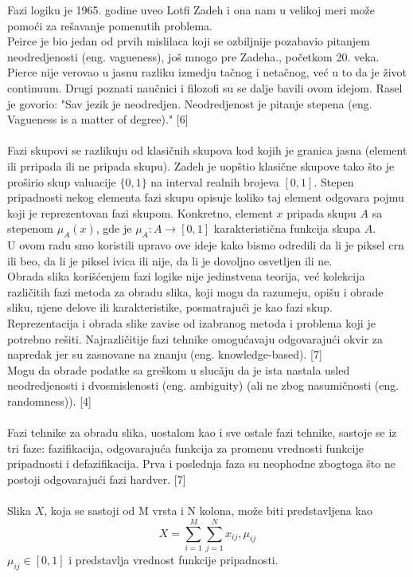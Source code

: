 \documentclass[12pt,a4paper]{article}
\theoremstyle{definition}
\theoremstyle{remark}
\theoremstyle{plain}
\begin{document}
Fazi logiku je 1965. godine uveo Lotfi Zadeh i ona nam u velikoj meri mo\v ze pomo\' ci za re\v savanje pomenutih problema. \\
Peirce je bio jedan od prvih mislilaca koji se ozbiljnije pozabavio pitanjem neodredjenosti (eng. vagueness), jo\v s mnogo pre Zadeha., po\v cetkom 20. veka. 
Pierce nije verovao u jasnu razliku izmedju ta\v cnog i neta\v cnog, ve\' c u to da je \v zivot continuum.
Drugi poznati nau\v cnici i filozofi su se dalje bavili ovom idejom. Rasel je govorio: "Sav jezik je neodredjen. Neodredjenost je pitanje stepena (eng. Vagueness is a matter of degree)." [6]
\\ \\
Fazi skupovi se razlikuju od klasi\v cnih skupova kod kojih je granica jasna (element ili prripada ili ne pripada skupu). Zadeh je uop\v stio klasi\v cne skupove tako \v sto je pro\v sirio skup valuacije $\{0, 1\}$ na interval realnih brojeva $[0, 1]$. Stepen pripadnosti nekog elementa fazi skupu opisuje koliko taj element odgovara pojmu koji je reprezentovan fazi skupom. Konkretno, element $x$ pripada skupu $A$ sa stepenom $\mu_{A}(x)$, gde je $\mu_{A} : A \rightarrow [0, 1]$ karakteristi\v cna funkcija skupa $A$.\\

U ovom radu smo koristili upravo ove ideje kako bismo odredili da li je piksel crn ili beo, da li je piksel ivica ili nije, da li je dovoljno osvetljen ili ne.\\

Obrada slika kori\v s\' cenjem fazi logike nije jedinstvena teorija, ve\' c kolekcija razli\v citih fazi metoda za obradu slika, koji mogu da razumeju, opi\v su i 
obrade sliku, njene delove ili karakteristike, posmatraju\' ci je kao fazi skup. \\
Reprezentacija i obrada slike zavise od izabranog metoda i problema koji je potrebno re\v siti.
Najrazli\v citije fazi tehnike omogu\' cavaju odgovaraju\' ci okvir za napredak jer su zasnovane na znanju (eng. knowledge-based). [7] \\ 
Mogu da obrade podatke sa gre\v skom u sluc\v aju da je ista nastala usled neodredjenosti i dvosmislenosti (eng. ambiguity) (ali ne zbog nasumi\v cnosti (eng. randomness)). [4]
\\ \\ 
Fazi tehnike za obradu slika, uostalom kao i sve ostale fazi tehnike, sastoje se iz tri faze: fazifikacija, odgovaraju\' ca funkcija za promenu vrednosti funkcije pripadnosti 
i defazifikacija. Prva i poslednja faza su neophodne zbogtoga \v sto ne postoji odgovaraju\' ci fazi hardver. [7]
\\ \\ 
Slika $X$, koja se sastoji od M vrsta i N kolona, mo\v ze biti predstavljena kao
\begin{equation}
  X = \sum_{i=1}^{M}\sum_{j=1}^{N} x_{ij}, \mu_{ij}
\end{equation}
$\mu_{ij} \in [0, 1]$ i predstavlja vrednost funkcije pripadnosti.
\end{document}

